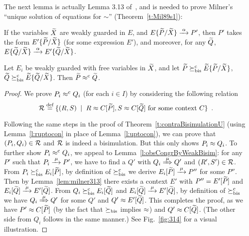 The next lemma is actually Lemma 3.13 of~\citep[p.~102]{Mil89}, and
is needed to prove Milner's ``unique solution of equations for
$\sim$'' (Theorem~\ref{t:Mil89s1}):
\begin{lemma}
  \label{lem:milner313}
  If the variables ${\widetilde X}$ are weakly guarded in $E$, and $E\{\til
  P/\til X\} \arr{\alpha} P'$, then $P'$ takes the form $E'\{\widetilde
  P/\widetilde X\}$ (for some expression $E'$), and moreover, for any ${\widetilde Q}$,
  $E\{\til Q/\til X\} \arr{\alpha} E'\{\til Q/\til X\}$.
\end{lemma}

\begin{theorem}
\label{t:rcontraBisimulationU}
Let $E_i$ be weakly guarded with free variables in $\widetilde X$,
and let $\widetilde P \mathrel{\succeq^{\rm{c}}_{\rm{bis}}} \widetilde E\{\widetilde P/\widetilde X\}$,
    $\widetilde Q \mathrel{\succeq^{\rm{c}}_{\rm{bis}}} \widetilde E\{\widetilde Q/\widetilde X\}$. Then $\widetilde P \mathrel{\approx^{\rm{c}}} \widetilde Q$.
\end{theorem}

\begin{proof}
We  prove $P_i \mathrel{\approx^{\rm{c}}} Q_i$ (for each $i \in I$) by considering
the following relation
\begin{equation*}
{\cal R} \stackrel{\mbox{\scriptsize def}}{=} \{(R,S) \; \mid \; R \approx C [\widetilde P], S \approx C [\widetilde Q] \mbox{~for some context
$C$} \} \enspace.
\end{equation*}

Following the same steps in the proof of
Theorem~\ref{t:contraBisimulationU}
(using Lemma~\ref{l:ruptocon}
in place of Lemma~\ref{l:uptocon}), we can prove that $(P_i, Q_i)
\in{\cal R}$ and ${\cal R}$ is indeed a bisimulation. But this only shows $P_i \approx Q_i$.
%
To further show $P_i \mathrel{\approx^{\rm{c}}} Q_i$, we appeal to
Lemma~\ref{l:obsCongrByWeakBisim}: for any $P'$ such that $P_i \arr{\mu} P'$, we have to
  find a $Q'$ with $Q_i \Arr{\mu} Q'$ and $(R',S') \in {\cal R}$.
%
From $P_i \mathrel{\succeq^{\rm{c}}_{\rm{bis}}} E_i[{\widetilde P}]$, by definition of $\mathrel{\succeq^{\rm{c}}_{\rm{bis}}}$ we derive $E_i[{\til P}] \arr{\mu}
P''$ for some $P''$. Then by Lemma~\ref{lem:milner313} there exists a context
$E'$ with $P'' = E'[{\widetilde P}]$ and $E_i[{\til Q}] \arr{\mu} E'[{\til Q}]$.
%
From $Q_i \mathrel{\succeq^{\rm{c}}_{\rm{bis}}} E_i[{\widetilde Q}]$ and $E_i[{\til Q}] \arr{\mu} E'[{\til
  Q}]$, by definition of $\mathrel{\succeq^{\rm{c}}_{\rm{bis}}}$ we have $Q_i \Arr{\mu} Q'$ for some
$Q'$ and $Q' \approx E'[{\widetilde Q}]$. This completes the proof, as we have
$P' \approx C[{\widetilde P}]$ (by the fact that $\mathrel{\succeq_{\rm{bis}}}$ implies $\approx$) and
$Q' \approx C[{\widetilde Q}]$. (The other side from $Q_i$ follows in the same manner.)
See Fig.~\ref{fig:314} for a visual illustration.
\end{proof}


